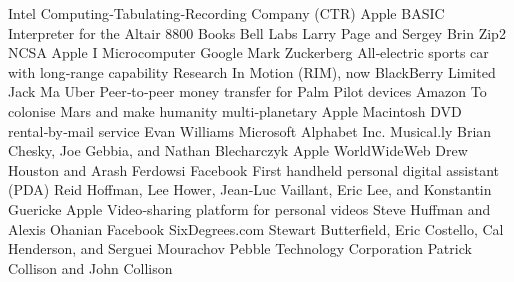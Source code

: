 \answerkey
{} Intel
 Computing‑Tabulating‑Recording Company (CTR)
 Apple
 BASIC Interpreter for the Altair 8800
 Books
 Bell Labs
 Larry Page and Sergey Brin
 Zip2
 NCSA
 Apple I Microcomputer
 Google
 Mark Zuckerberg
 All‑electric sports car with long‑range capability
 Research In Motion (RIM), now BlackBerry Limited
 Jack Ma
 Uber
 Peer‑to‑peer money transfer for Palm Pilot devices
 Amazon
 To colonise Mars and make humanity multi‑planetary
 Apple Macintosh
 DVD rental‑by‑mail service
 Evan Williams
 Microsoft
 Alphabet Inc.
 Musical.ly
 Brian Chesky, Joe Gebbia, and Nathan Blecharczyk
 Apple
 WorldWideWeb
 Drew Houston and Arash Ferdowsi
 Facebook
 First handheld personal digital assistant (PDA)
 Reid Hoffman, Lee Hower, Jean‑Luc Vaillant, Eric Lee, and Konstantin Guericke
 Apple
 Video‑sharing platform for personal videos
 Steve Huffman and Alexis Ohanian
 Facebook
 SixDegrees.com
 Stewart Butterfield, Eric Costello, Cal Henderson, and Serguei Mourachov
 Pebble Technology Corporation
 Patrick Collison and John Collison
\endanswerkey
